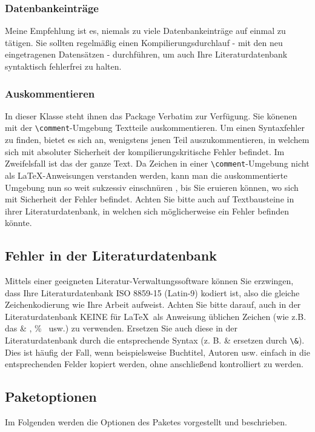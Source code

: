 \documentclass[english, trackchanges, hyperref, ngerman ,pdf, mp, mppdf]{wise}
\newcommand\code[1]{\texttt{#1}}
\newcommand\command[1]{\code{\textbackslash{}#1}}
\begin{document}
\subsubsection{Datenbankeinträge}
Meine Empfehlung ist es, niemals zu viele Datenbankeinträge auf einmal zu tätigen. Sie sollten regelmäßig einen Kompilierungsdurchlauf - mit den neu eingetragenen Datensätzen - durchführen, um auch Ihre Literaturdatenbank syntaktisch fehlerfrei zu halten. 

\subsubsection{Auskommentieren}
In dieser Klasse steht ihnen das Package Verbatim zur Verfügung. Sie könenen mit der \command{comment}-Umgebung Textteile auskommentieren. Um einen Syntaxfehler zu finden, bietet es sich an, wenigstens jenen Teil auszukommentieren, in welchem sich mit absoluter Sicherheit der kompilierungskritische Fehler befindet. Im Zweifelsfall ist das der ganze Text. Da Zeichen in einer \command{comment}-Umgebung nicht als \LaTeX -Anweisungen verstanden werden, kann man die auskommentierte Umgebung nun so weit sukzessiv \glqq einschnüren \grqq , bis Sie eruieren können, wo sich mit Sicherheit der Fehler befindet. Achten Sie bitte auch auf Textbausteine in ihrer Literaturdatenbank, in welchen sich möglicherweise ein Fehler befinden könnte. 

\subsection{Fehler in der Literaturdatenbank}
Mittels einer geeigneten Literatur-Verwaltungssoftware können Sie erzwingen, dass Ihre Literaturdatenbank ISO 8859-15 (Latin-9) kodiert ist, also die gleiche Zeichenkodierung wie Ihre Arbeit aufweist. Achten Sie bitte darauf, auch in der Literaturdatenbank KEINE für \LaTeX \ als Anweisung üblichen Zeichen (wie z.B. das \glqq \& \grqq , \glqq \% \grqq \ usw.) zu verwenden. Ersetzen Sie auch diese in der Literaturdatenbank durch die entsprechende Syntax (z. B. \&  ersetzen durch  \command{\&}). Dies ist häufig der Fall, wenn beispielsweise Buchtitel, Autoren usw. einfach in die entsprechenden Felder kopiert werden, ohne anschließend kontrolliert zu werden.

\subsection{Paketoptionen}\label{sec:paketoptionen}
Im Folgenden werden die Optionen des Paketes vorgestellt und beschrieben.
\end{document}
